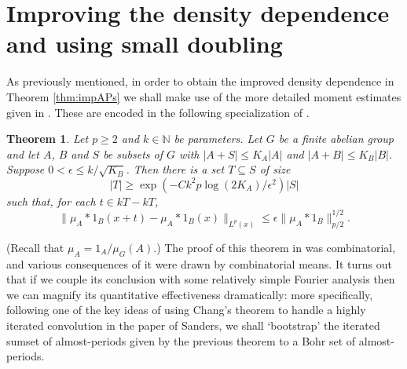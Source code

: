\documentclass[12pt,a4paper,reqno]{amsart}
\numberwithin{equation}{section}
\theoremstyle{plain}
\newtheorem{theorem}[subsection]{Theorem}
\theoremstyle{definition}
\renewcommand{\leq}{\leqslant}
\renewcommand{\geq}{\geqslant}
\renewcommand{\subset}{\subseteq}
\def\N{\mathbb{N}}
\providecommand{\abs}[1]{\lvert#1\rvert}
\providecommand{\norm}[1]{\lVert #1 \rVert}
\theoremstyle{plain}
\begin{document}
\section{Improving the density dependence and using small doubling}\label{section:strong_lp}
As previously mentioned, in order to obtain the improved density dependence in Theorem \ref{thm:impAPs} we shall make use of the more detailed moment estimates given in \cite{croot-sisask}. These are encoded in the following specialization of \cite[Proposition 3.3]{croot-sisask}.

\begin{theorem}\label{thm:original_lp}
Let $p \geq 2$ and $k \in \N$ be parameters. Let $G$ be a finite abelian group and let $A$, $B$ and $S$ be subsets of $G$ with $\abs{A+S} \leq K_A\abs{A}$ and $\abs{A+B} \leq K_B\abs{B}$. Suppose $0 < \epsilon \leq k/\sqrt{K_B}$. Then there is a set $T \subset S$ of size
\[ \abs{T} \geq \exp(-C k^2 p \log(2K_A)/\epsilon^2) |S| \]
such that, for each $t \in kT-kT$,
\[ \norm{ \mu_A*1_B(x+t) - \mu_A*1_B(x) }_{L^p(x)} \leq \epsilon \norm{ \mu_A*1_B }_{p/2}^{1/2}. \]
\end{theorem}

(Recall that $\mu_A = 1_A/\mu_G(A)$.) The proof of this theorem in \cite{croot-sisask} was combinatorial, and various consequences of it were drawn by combinatorial means. It turns out that if we couple its conclusion with some relatively simple Fourier analysis then we can magnify its quantitative effectiveness dramatically: more specifically, following one of the key ideas of using Chang's theorem to handle a highly iterated convolution in the paper \cite{sanders:bogolyubov} of Sanders, we shall `bootstrap' the iterated sumset of almost-periods given by the previous theorem to a Bohr set of almost-periods.
\end{document}

